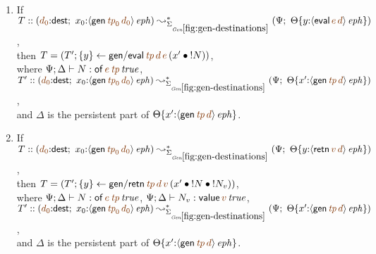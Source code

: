 \bigskip
\begin{lemma}~
\begin{enumerate}
\item If 
   $T :: (\lf{d_0}{:}{\sf dest}; ~
            x_0{:}\iseph{\susp{{\sf gen}\,\lf{{\it tp}_0}\,\lf{d_0}}})
         \leadsto^*_{\siggendests}
         (\Psi; ~
          \tackon{\Theta}
           {y{:}\iseph{\susp{{\sf eval}\,\lf{e}\,\lf{d}}}})$,
\\ then 
   $T = \left(T';
       \trstep{y}{{\sf gen/eval}\,\lf{{\it tp}}\,\lf{d}\,\lf{e}
       \,(\tfuser{x'}{\tbangr{N}})}\right)$,
\\ where
   $\Psi; \Delta \vdash N : \isconc{{\sf of}\,\lf{e}\,\lf{{\it tp}}}$,
\\ $T' :: (\lf{d_0}{:}{\sf dest}; ~
            x_0{:}\iseph{\susp{{\sf gen}\,\lf{{\it tp}_0}\,\lf{d_0}}})
         \leadsto^*_{\siggendests}
         (\Psi; ~
          \tackon{\Theta}
           {x'{:}\iseph{\susp{{\sf gen}\,\lf{{\it tp}}\,\lf{d}}}})$,
\\ and $\Delta$ is the persistent part of 
   $\tackon{\Theta}
           {x'{:}\iseph{\susp{{\sf gen}\,\lf{{\it tp}}\,\lf{d}}}}$.


\medskip
\item If 
   $T :: (\lf{d_0}{:}{\sf dest}; ~
            x_0{:}\iseph{\susp{{\sf gen}\,\lf{{\it tp}_0}\,\lf{d_0}}})
         \leadsto^*_{\siggendests}
         (\Psi; ~
          \tackon{\Theta}
           {y{:}\iseph{\susp{{\sf retn}\,\lf{v}\,\lf{d}}}})$,
\\ then 
   $T = \left(T';
       \trstep{y}{{\sf gen/retn}\,\lf{{\it tp}}\,\lf{d}\,\lf{v}
       \,(\tfuser{x'}{\tfuser{\tbangr{N}}{\tbangr{N_v}}})}\right)$,
\\ where
   $\Psi; \Delta \vdash N : \isconc{{\sf of}\,\lf{e}\,\lf{{\it tp}}}$,
   $\Psi; \Delta \vdash N_v : \isconc{{\sf value}\,\lf{v}}$, 
\\ $T' :: (\lf{d_0}{:}{\sf dest}; ~
            x_0{:}\iseph{\susp{{\sf gen}\,\lf{{\it tp}_0}\,\lf{d_0}}})
         \leadsto^*_{\siggendests}
         (\Psi; ~
          \tackon{\Theta}
           {x'{:}\iseph{\susp{{\sf gen}\,\lf{{\it tp}}\,\lf{d}}}})$,
\\ and $\Delta$ is the persistent part of 
   $\tackon{\Theta}
           {x'{:}\iseph{\susp{{\sf gen}\,\lf{{\it tp}}\,\lf{d}}}}$.



\end{enumerate}
\end{lemma}
